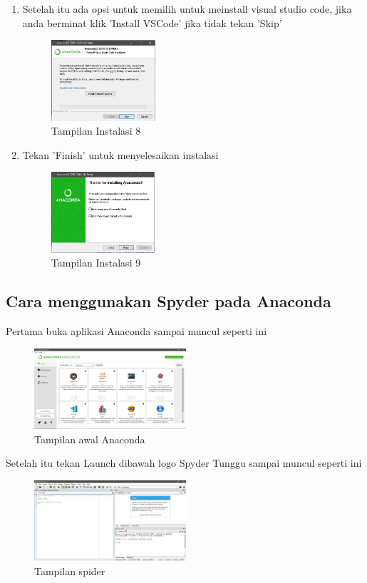 \begin{enumerate}
  \item Setelah itu ada opsi untuk memilih untuk meinstall visual studio code, jika anda berminat klik 'Install VSCode' jika tidak tekan 'Skip'
\begin{figure}[!htbp]
  \centering
  \includegraphics[height=3cm]{chapters/gambar/install8.jpg}
  \caption{Tampilan Instalasi 8}
\end{figure}

  \item Tekan 'Finish' untuk menyelesaikan instalasi
\begin{figure}[!htbp]
  \centering
  \includegraphics[height=3cm]{chapters/gambar/install9.jpg}
  \caption{Tampilan Instalasi 9}
\end{figure}

\end{enumerate}

\subsection{Cara menggunakan Spyder pada Anaconda}
Pertama buka aplikasi Anaconda sampai muncul seperti ini
\begin{figure}[!htbp]
  \centering
  \includegraphics[height=3cm]{chapters/gambar/gambaranaconda.jpg}
  \caption{Tampilan awal Anaconda}
\end{figure}

Setelah itu tekan Launch dibawah logo Spyder
Tunggu sampai muncul seperti ini
\begin{figure}[!htbp]
  \centering
  \includegraphics[height=3cm]{chapters/gambar/gambarspider.jpg}
  \caption{Tampilan spider}
\end{figure}

